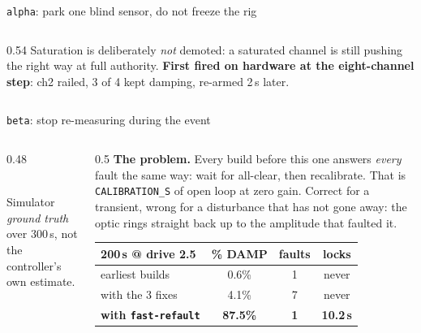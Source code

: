 \documentclass[aspectratio=169]{beamer}
\begin{document}
\begin{frame}{\texttt{alpha}: park one blind sensor, do not freeze the rig}
\begin{columns}[T]
\begin{column}{0.54\textwidth}
      \vspace{2mm}
      Saturation is deliberately \emph{not} demoted: a saturated channel is
      still pushing the right way at full authority.
      \textbf{First fired on hardware at the eight-channel step}: ch2 railed, 3 of 4 kept
      damping, re-armed 2\,s later.
    \end{column}
  \end{columns}
\end{frame}

\begin{frame}{\texttt{beta}: stop re-measuring during the event}
  \begin{columns}[T]
    \begin{column}{0.48\textwidth}
      \centering
      \\
      {\scriptsize Simulator \emph{ground truth} over 300\,s, not the
      controller's own estimate.}
    \end{column}
    \begin{column}{0.5\textwidth}
      \footnotesize
      \textbf{The problem.} Every build before this one answers \emph{every} fault the same way: wait
      for all-clear, then recalibrate. That is \texttt{CALIBRATION\_S} of open
      loop at zero gain. Correct for a transient, wrong for a disturbance that
      has not gone away: the optic rings straight back up to the amplitude that
      faulted it.

      \vspace{2mm}
      \centering
      {\scriptsize
      \begin{tabular}{@{}lccc@{}}
        \toprule
        200\,s @ drive 2.5 & \% DAMP & faults & locks \\
        \midrule
        earliest builds & 0.6\% & 1 & never \\
        with the 3 fixes & 4.1\% & 7 & never \\
        \textbf{with \texttt{fast-refault}} & \textbf{87.5\%} & \textbf{1} & \textbf{10.2\,s} \\
        \bottomrule
      \end{tabular}}


\end{column}
\end{columns}
\end{frame}
\end{document}
